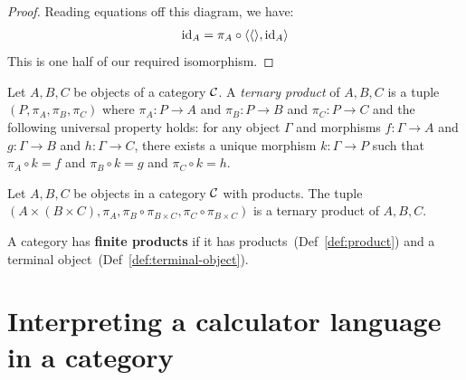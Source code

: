 \begin{proof}
  Reading equations off this diagram, we have:
  \begin{align}
    \operatorname{id}_A = \pi_A \circ \langle \langle \rangle, \operatorname{id}_A \rangle
  \end{align}
  This is one half of our required isomorphism.

\end{proof}

\begin{definition}
  Let \(A,B,C\) be objects of a category \(\mathcal C\).
  A \emph{ternary product} of \(A,B,C\)
  is a tuple \((P,\pi_A,\pi_B,\pi_C)\)
  where \(\pi_A : P\to A\) and \(\pi_B : P \to B\)
  and \(\pi_C : P \to C\)
  and the following universal property holds:
  for any object \(\Gamma\)
  and morphisms \(f : \Gamma \to A\)
  and \(g : \Gamma \to B\) and \(h : \Gamma \to C\),
  there exists a unique morphism \(k : \Gamma \to P\)
  such that \(\pi_A \circ k = f\)
  and \(\pi_B \circ k = g\) and \(\pi_C \circ k = h\).
\end{definition}

\begin{proposition}
  Let \(A,B,C\) be objects in a category \(\mathcal C\) with products.
  The tuple \((A\times (B\times C), \pi_A, \pi_B \circ \pi_{B\times C}, \pi_C \circ \pi_{B\times C})\)
  is a ternary product of \(A,B,C\).
\end{proposition}

\begin{definition} \label{def:finite-products}
  A category has \textbf{finite products}
  if it has products~(Def~\ref{def:product}) and a terminal object~(Def~\ref{def:terminal-object}).
\end{definition}

\section{Interpreting a calculator language in a category}


